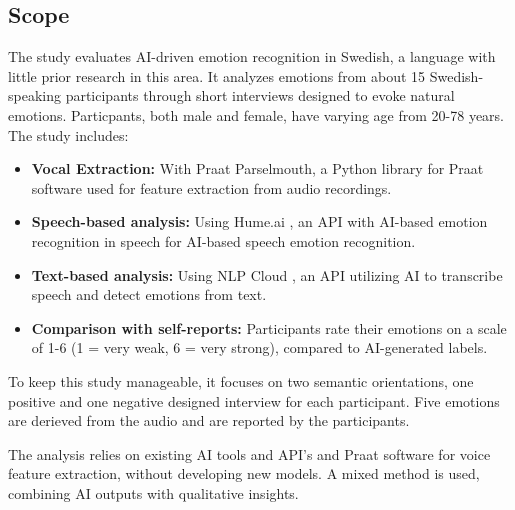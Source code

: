\subsection{Scope}
The study evaluates AI-driven emotion recognition in Swedish, a language with little prior research in this area. It analyzes emotions from about 15 Swedish-speaking participants through short interviews designed to evoke natural emotions. 
Particpants, both male and female, have varying age from 20-78 years. 
The study includes: 
\begin{itemize}
    \item \textbf{Vocal Extraction: } With Praat Parselmouth, a Python library for Praat software used for feature extraction from audio recordings. 
    \item \textbf{Speech-based analysis:} Using Hume.ai \autocite{HumeAI-AboutHume}, an API with AI-based emotion recognition in speech for AI-based speech emotion recognition. 
    \item \textbf{Text-based analysis:} Using NLP Cloud \autocite{NLPCloud}, an API utilizing AI to transcribe speech and detect emotions from text.
    \item \textbf{Comparison with self-reports:} Participants rate their emotions on a scale of 1-6 (1 = very weak, 6 = very strong), compared to AI-generated labels. 
\end{itemize}
To keep this study manageable, it focuses on two semantic orientations, one positive and one negative designed interview for each participant. Five emotions are derieved from the audio and are reported by the participants.

The analysis relies on existing AI tools and API’s \autocite{HumeAI-AboutHume, NLPCloud} and Praat software for voice feature extraction, without developing new models. A mixed method is used, combining AI outputs with qualitative insights.

